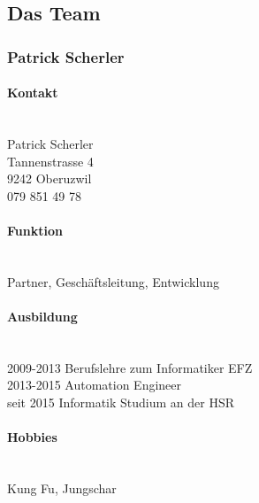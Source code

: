 \clearpage

\subsection{Das Team}

\subsubsection{Patrick Scherler}
\noindent\begin{minipage}{0.7\textwidth}
	\paragraph{Kontakt} \hfill \\
	Patrick Scherler \\
	Tannenstrasse 4 \\
	9242 Oberuzwil \\
	079 851 49 78 \\
	
	\paragraph{Funktion} \hfill \\
	Partner, Geschäftsleitung, Entwicklung \\
	
	\paragraph{Ausbildung} \hfill \\
	2009-2013 \hspace{2cm} Berufslehre zum Informatiker EFZ \\
	2013-2015 \hspace{2cm} Automation Engineer \\
	seit 2015 \hspace{2.2cm} Informatik Studium an der HSR \\
		
	\paragraph{Hobbies} \hfill \\
	Kung Fu, Jungschar \\
\end{minipage}
\hfill
